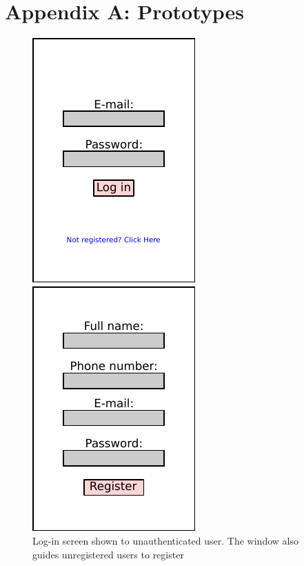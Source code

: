 \documentclass{article}
\begin{document}

\newpage
\section{Appendix A: Prototypes}
\begin{figure}[!htpb]
    \centering
    \begin{minipage}{0.25\textwidth}
        \centering
        \includegraphics[scale=1]{login.pdf}
        \caption{Log-in screen shown to unauthenticated user. The window also guides unregistered users to register}
        \label{fig:login}
    \end{minipage}\hfill
    \begin{minipage}{0.25\textwidth}
        \centering
        \includegraphics[scale=1]{register.pdf}

\end{minipage}
\end{figure}
\end{document}
